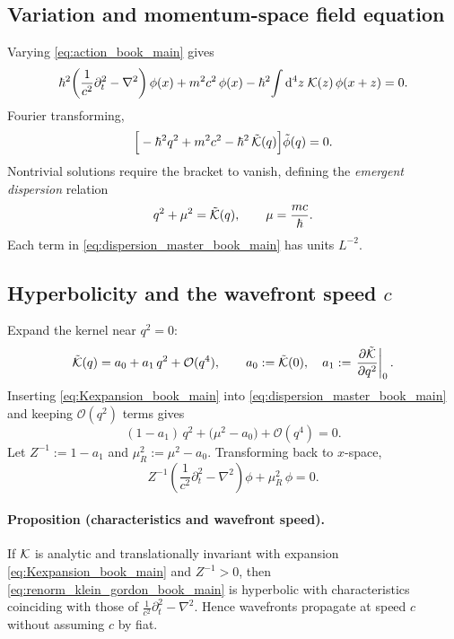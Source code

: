 \subsection{Variation and momentum-space field equation}
Varying \eqref{eq:action_book_main} gives
\begin{equation}\label{eq:eom_xspace_book_main}
\hbar^2\!\left(\frac{1}{c^{2}}\partial_t^2-\nabla^2\right)\phi(x)+m^2c^2\,\phi(x)-\hbar^2\!\int \mathrm{d}^4 z\;\mathcal{K}(z)\,\phi(x+z)=0.
\end{equation}
Fourier transforming,
\begin{equation}\label{eq:eom_qspace_book_main}
\Big[-\hbar^2 q^2 + m^2c^2 - \hbar^2\,\tilde{\mathcal{K}}(q)\Big]\tilde{\phi}(q)=0.
\end{equation}
Nontrivial solutions require the bracket to vanish, defining the \emph{emergent dispersion} relation
\begin{equation}\label{eq:dispersion_master_book_main}
q^2+\mu^2=\tilde{\mathcal{K}}(q),\qquad \mu=\frac{mc}{\hbar}.
\end{equation}
Each term in \eqref{eq:dispersion_master_book_main} has units \(L^{-2}\).

\subsection{Hyperbolicity and the wavefront speed \(c\)}
Expand the kernel near \(q^2=0\):
\begin{equation}\label{eq:Kexpansion_book_main}
\tilde{\mathcal{K}}(q)=a_0+a_1\,q^2+\mathcal{O}(q^4),\qquad
a_0:=\tilde{\mathcal{K}}(0),\quad a_1:=\left.\frac{\partial \tilde{\mathcal{K}}}{\partial q^2}\right|_{0}.
\end{equation}
Inserting \eqref{eq:Kexpansion_book_main} into \eqref{eq:dispersion_master_book_main} and keeping \(\mathcal{O}(q^2)\) terms gives
\begin{equation}
(1-a_1)\,q^2+\big(\mu^2-a_0\big)+\mathcal{O}(q^4)=0.
\end{equation}
Let \(Z^{-1}:=1-a_1\) and \(\mu_R^2:=\mu^2-a_0\). Transforming back to \(x\)-space,
\begin{equation}\label{eq:renorm_klein_gordon_book_main}
Z^{-1}\!\left(\frac{1}{c^{2}}\partial_t^2-\nabla^2\right)\phi+\mu_R^2\,\phi=0.
\end{equation}

\paragraph{Proposition (characteristics and wavefront speed).}
If \(\mathcal{K}\) is analytic and translationally invariant with expansion \eqref{eq:Kexpansion_book_main} and \(Z^{-1}>0\), then \eqref{eq:renorm_klein_gordon_book_main} is hyperbolic with characteristics coinciding with those of \(\frac{1}{c^{2}}\partial_t^2-\nabla^2\). Hence wavefronts propagate at speed \(c\) without assuming \(c\) by fiat.

